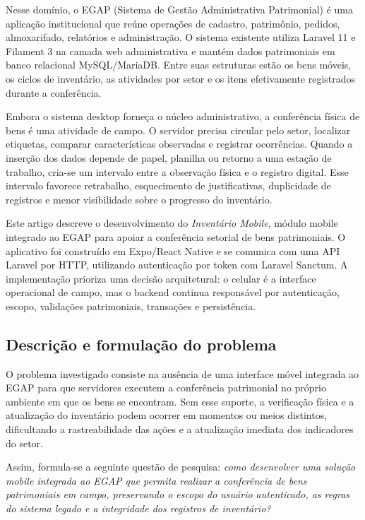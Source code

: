 \documentclass[12pt,a4paper]{article}
\begin{document}
Nesse domínio, o EGAP (Sistema de Gestão Administrativa Patrimonial) é uma
aplicação institucional que reúne operações de cadastro, patrimônio, pedidos,
almoxarifado, relatórios e administração. O sistema existente utiliza Laravel
11 e Filament 3 na camada web administrativa e mantém dados patrimoniais em
banco relacional MySQL/MariaDB. Entre suas estruturas estão os bens móveis, os
ciclos de inventário, as atividades por setor e os itens efetivamente
registrados durante a conferência.

Embora o sistema desktop forneça o núcleo administrativo, a conferência física
de bens é uma atividade de campo. O servidor precisa circular pelo setor,
localizar etiquetas, comparar características observadas e registrar
ocorrências. Quando a inserção dos dados depende de papel, planilha ou retorno
a uma estação de trabalho, cria-se um intervalo entre a observação física e o
registro digital. Esse intervalo favorece retrabalho, esquecimento de
justificativas, duplicidade de registros e menor visibilidade sobre o progresso
do inventário.

Este artigo descreve o desenvolvimento do \textit{Inventário Mobile}, módulo
mobile integrado ao EGAP para apoiar a conferência setorial de bens
patrimoniais. O aplicativo foi construído em Expo/React Native e se comunica
com uma API Laravel por HTTP, utilizando autenticação por token com Laravel
Sanctum. A implementação prioriza uma decisão arquitetural: o celular é a
interface operacional de campo, mas o backend continua responsável por
autenticação, escopo, validações patrimoniais, transações e persistência.

\subsection{Descrição e formulação do problema}

O problema investigado consiste na ausência de uma interface móvel integrada ao
EGAP para que servidores executem a conferência patrimonial no próprio ambiente
em que os bens se encontram. Sem esse suporte, a verificação física e a
atualização do inventário podem ocorrer em momentos ou meios distintos,
dificultando a rastreabilidade das ações e a atualização imediata dos
indicadores do setor.

Assim, formula-se a seguinte questão de pesquisa: \textit{como desenvolver uma
solução mobile integrada ao EGAP que permita realizar a conferência de bens
patrimoniais em campo, preservando o escopo do usuário autenticado, as regras
do sistema legado e a integridade dos registros de inventário?}
\end{document}
